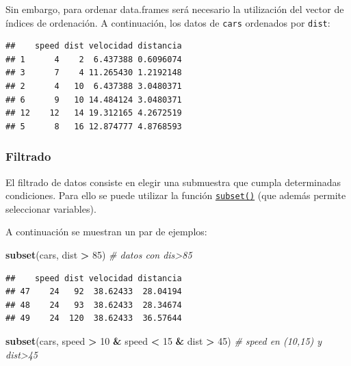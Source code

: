 \documentclass[]{book}
\newenvironment{Shaded}{\begin{snugshade}}{\end{snugshade}}
\newcommand{\KeywordTok}[1]{\textcolor[rgb]{0.13,0.29,0.53}{\textbf{#1}}}
\newcommand{\DecValTok}[1]{\textcolor[rgb]{0.00,0.00,0.81}{#1}}
\newcommand{\StringTok}[1]{\textcolor[rgb]{0.31,0.60,0.02}{#1}}
\newcommand{\CommentTok}[1]{\textcolor[rgb]{0.56,0.35,0.01}{\textit{#1}}}
\newcommand{\OperatorTok}[1]{\textcolor[rgb]{0.81,0.36,0.00}{\textbf{#1}}}
\newcommand{\NormalTok}[1]{#1}
\begin{document}
Sin embargo, para ordenar data.frames será necesario la utilización del
vector de índices de ordenación. A continuación, los datos de
\texttt{cars} ordenados por \texttt{dist}:

\begin{Shaded}
\end{Shaded}

\begin{verbatim}
##    speed dist velocidad distancia
## 1      4    2  6.437388 0.6096074
## 3      7    4 11.265430 1.2192148
## 2      4   10  6.437388 3.0480371
## 6      9   10 14.484124 3.0480371
## 12    12   14 19.312165 4.2672519
## 5      8   16 12.874777 4.8768593
\end{verbatim}

\subsubsection{Filtrado}\label{filtrado}

El filtrado de datos consiste en elegir una submuestra que cumpla
determinadas condiciones. Para ello se puede utilizar la función
\href{https://www.rdocumentation.org/packages/base/versions/3.6.1/topics/subset}{\texttt{subset()}}
(que además permite seleccionar variables).

A continuación se muestran un par de ejemplos:

\begin{Shaded}
\begin{Highlighting}[]
\KeywordTok{subset}\NormalTok{(cars, dist }\OperatorTok{>}\StringTok{ }\DecValTok{85}\NormalTok{) }\CommentTok{# datos con dis>85}
\end{Highlighting}
\end{Shaded}

\begin{verbatim}
##    speed dist velocidad distancia
## 47    24   92  38.62433  28.04194
## 48    24   93  38.62433  28.34674
## 49    24  120  38.62433  36.57644
\end{verbatim}

\begin{Shaded}
\begin{Highlighting}[]
\KeywordTok{subset}\NormalTok{(cars, speed }\OperatorTok{>}\StringTok{ }\DecValTok{10} \OperatorTok{&}\StringTok{ }\NormalTok{speed }\OperatorTok{<}\StringTok{ }\DecValTok{15} \OperatorTok{&}\StringTok{ }\NormalTok{dist }\OperatorTok{>}\StringTok{ }\DecValTok{45}\NormalTok{) }\CommentTok{# speed en (10,15) y dist>45}
\end{Highlighting}
\end{Shaded}
\end{document}
